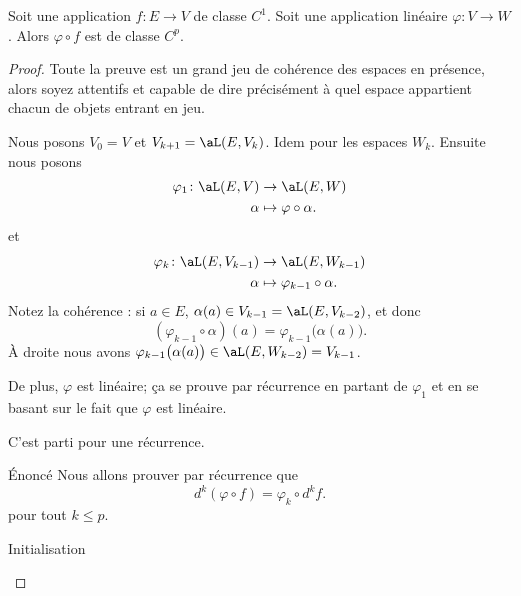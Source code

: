 \begin{proposition}      \label{PROPooRCZOooSgvpSE}
    Soit une application \( f\colon E\to V\) de classe \( C^1\). Soit une application linéaire \( \varphi\colon V \to W\). Alors \( \varphi\circ f\) est de classe \( C^p\).
\end{proposition}

\begin{proof}
    Toute la preuve est un grand jeu de cohérence des espaces en présence, alors soyez attentifs et capable de dire précisément à quel espace appartient chacun de objets entrant en jeu.

    Nous posons \( V_0=V\) et \( V_{k+1}=\aL(E,V_k)\). Idem pour les espaces \( W_k\). Ensuite nous posons
    \begin{equation}
        \begin{aligned}
            \varphi_1\colon \aL(E,V)&\to \aL(E,W) \\
            \alpha&\mapsto \varphi\circ \alpha.
        \end{aligned}
    \end{equation}
    et
    \begin{equation}
        \begin{aligned}
            \varphi_k\colon \aL(E,V_{k-1})&\to \aL(E,W_{k-1}) \\
            \alpha&\mapsto \varphi_{k-1}\circ \alpha.
        \end{aligned}
    \end{equation}
    Notez la cohérence : si \( a\in E\), \( \alpha(a)\in V_{k-1}=\aL(E,V_{k-2})\), et donc
    \begin{equation}
        (\varphi_{k-1}\circ\alpha)(a)=\varphi_{k-1}\big( \alpha(a) \big).
    \end{equation}
    À droite nous avons \( \varphi_{k-1}\big( \alpha(a) \big)\in \aL(E,W_{k-2})=V_{k-1}\).

    De plus, \( \varphi\) est linéaire; ça se prouve par récurrence en partant de \( \varphi_1\) et en se basant sur le fait que \( \varphi\) est linéaire.

    C'est parti pour une récurrence.

    \begin{subproof}
        \item[Énoncé]
            Nous allons prouver par récurrence que
            \begin{equation}
                d^k(\varphi\circ f)=\varphi_k\circ d^kf.
            \end{equation}
            pour tout \( k\leq p\).
        \item[Initialisation]
 

\end{subproof}
\end{proof}
